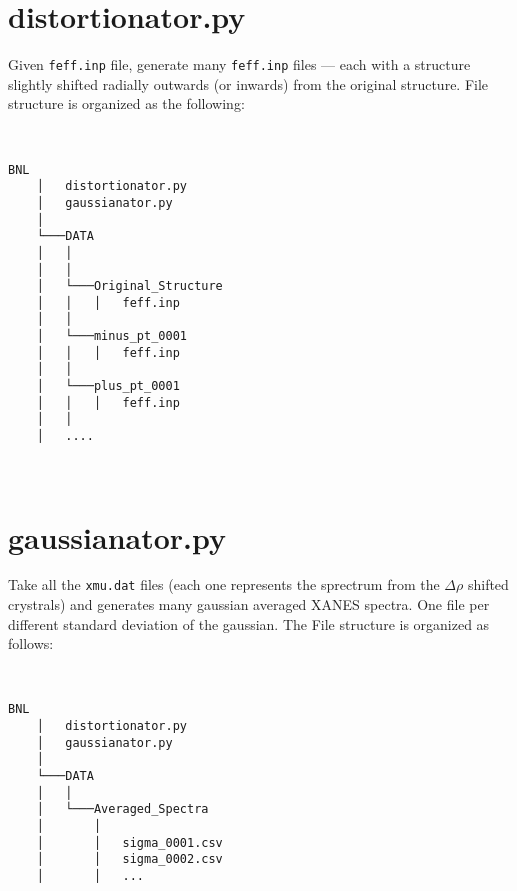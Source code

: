 

\section{distortionator.py}
Given \texttt{feff.inp} file, generate many \texttt{feff.inp} files --- each with a structure slightly shifted radially outwards (or inwards) from the original structure. File structure is organized as the following: 

\begin{minipage}{\linewidth}
~ \\
\begin{Verbatim}[samepage=true]
    BNL
    │   distortionator.py
    │   gaussianator.py
    │       
    └───DATA
    │   │       
    │   │
    │   └───Original_Structure
    │   │   │   feff.inp
    │   │       
    │   └───minus_pt_0001
    │   │   │   feff.inp
    │   │       
    │   └───plus_pt_0001
    │   │   │   feff.inp
    │   │
    │   ....        
\end{Verbatim}
~
\end{minipage}

\section{gaussianator.py} \label{appendix:gaussianator}
Take all the \texttt{xmu.dat} files (each one represents the sprectrum from the $\Delta \rho$ shifted crystrals) and generates many gaussian averaged XANES spectra. One file per different standard deviation of the gaussian. The File structure is organized as follows: 

\begin{minipage}{\linewidth}
~ \\
\begin{Verbatim}[samepage=true]
    BNL
    │   distortionator.py
    │   gaussianator.py   
    │
    └───DATA
    │   │ 
    │   └───Averaged_Spectra
    │       │       
    │       │   sigma_0001.csv
    │       │   sigma_0002.csv
    │       │   ...      
\end{Verbatim}
~
\end{minipage}

